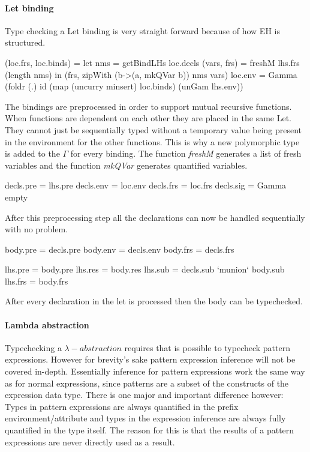 \paragraph{Let binding}
Type checking a Let binding is very straight forward because of how EH is structured.

\begin{code}
(loc.frs, loc.binds)  = let nms         = getBindLHs loc.decls
                            (vars, frs) = freshM lhs.frs (length nms)
                        in (frs, zipWith (\a b->(a, mkQVar b)) nms vars)
loc.env   = Gamma (foldr (.) id (map (uncurry minsert) loc.binds) (unGam lhs.env))
\end{code}
The bindings are preprocessed in order to support mutual recursive functions. When functions are dependent on each other they are placed in the same Let. They cannot just be sequentially typed without a temporary value being present in the environment for the other functions. This is why a new polymorphic type is added to the $\Gamma$ for every binding. The function \emph{freshM} generates a list of fresh variables and the function \emph{mkQVar} generates quantified variables.

\begin{code}
decls.pre = lhs.pre
decls.env = loc.env
decls.frs = loc.frs
decls.sig = Gamma empty
\end{code}
After this preprocessing step all the declarations can now be handled sequentially with no problem.

\begin{code}
body.pre = decls.pre
body.env = decls.env 
body.frs = decls.frs

lhs.pre = body.pre
lhs.res = body.res
lhs.sub = decls.sub `munion` body.sub
lhs.frs = body.frs
\end{code}
After every declaration in the let is processed then the body can be typechecked.

\paragraph{Lambda abstraction}
Typechecking a $\lambda-abstraction$ requires that is possible to typecheck pattern expressions. However for brevity's sake pattern expression inference will not be covered in-depth. Essentially inference for pattern expressions work the same way as for normal expressions, since patterns are a subset of the constructs of the expression data type. There is one major and important difference however: Types in pattern expressions are always quantified in the prefix environment/attribute and types in the expression inference are always fully quantified in the type itself. The reason for this is that the results of a pattern expressions are never directly used as a result.

